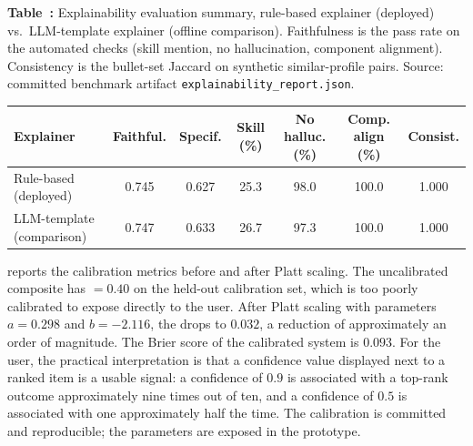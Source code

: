 \begin{center}
\label{tab:explainability}
\par\smallskip\noindent\textbf{Table~\thetable:} Explainability evaluation summary, rule-based explainer (deployed) vs.\ LLM-template explainer (offline comparison). Faithfulness is the pass rate on the automated checks (skill mention, no hallucination, component alignment). Consistency is the bullet-set Jaccard on synthetic similar-profile pairs. Source: committed benchmark artifact \texttt{explainability\_report.json}.
\par\smallskip
\footnotesize
\setlength{\tabcolsep}{3pt}
\begin{tabular*}{\linewidth}{@{\extracolsep{\fill}}lcccccc@{}}
\toprule
Explainer & Faithful. & Specif. & Skill (\%) & No halluc. (\%) & Comp. align (\%) & Consist. \\
\midrule
Rule-based (deployed)       & 0.745 & 0.627 & 25.3 & 98.0 & 100.0 & 1.000 \\
LLM-template (comparison)   & 0.747 & 0.633 & 26.7 & 97.3 & 100.0 & 1.000 \\
\bottomrule
\end{tabular*}
\par\vspace{0.4em}
\normalsize
\end{center}

 reports the calibration metrics before and after Platt scaling.
The uncalibrated composite has \ece{} $= 0.40$ on the held-out calibration set, which is too poorly calibrated to expose directly to the user.
After Platt scaling with parameters $a = 0.298$ and $b = -2.116$, the \ece{} drops to $0.032$, a reduction of approximately an order of magnitude.
The Brier score of the calibrated system is $0.093$.
For the user, the practical interpretation is that a confidence value displayed next to a ranked item is a usable signal: a confidence of $0.9$ is associated with a top-rank outcome approximately nine times out of ten, and a confidence of $0.5$ is associated with one approximately half the time.
The calibration is committed and reproducible; the parameters are exposed in the prototype.

